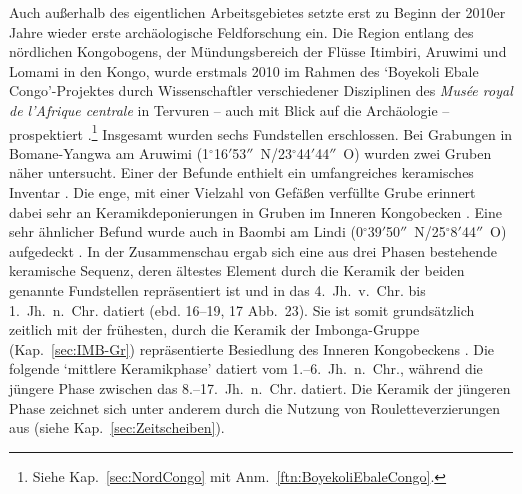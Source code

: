 Auch außerhalb des eigentlichen Arbeitsgebietes setzte erst zu Beginn der 2010er Jahre wieder erste archäologische Feldforschung ein. Die Region entlang des nördlichen Kongobogens, der Mündungsbereich der Flüsse Itimbiri, Aruwimi und Lomami in den Kongo, wurde erstmals 2010 im Rahmen des \enquote*{Boyekoli Ebale Congo}-Projektes durch Wissenschaftler verschiedener Disziplinen des \textit{Musée royal de l'Afrique centrale} in Tervuren -- auch mit Blick auf die Archäologie -- prospektiert \parencite{LivingstoneSmith.2011}.\footnote{Siehe Kap.~\ref{sec:NordCongo} mit Anm.~\ref{ftn:BoyekoliEbaleCongo}.} Insgesamt wurden sechs Fundstellen erschlossen. Bei Grabungen in Bomane-Yangwa am Aruwimi (1$^\circ$16$'$53$''$~N/23$^\circ$44$'$44$''$~O) wurden zwei Gruben näher untersucht. Einer der Befunde enthielt ein umfangreiches keramisches Inventar \parencite[ebd. 13 Abb. 2; ][5 Abb.~3]{LivingstoneSmith.2017}. Die enge, mit einer Vielzahl von Gefäßen verfüllte Grube erinnert dabei sehr an Keramikdeponierungen in Gruben im Inneren Kongobecken \parencite[siehe][256--264]{Wotzka.1993}. Eine sehr ähnlicher Befund wurde auch in Baombi am Lindi (0$^\circ$39$'$50$''$~N/25$^\circ$8$'$44$''$~O) aufgedeckt \parencites[78--79 Abb.~5--6]{Cornelissen.2013}[8 Abb.~10]{LivingstoneSmith.2017}. In der Zusammenschau ergab sich eine aus drei Phasen bestehende keramische Sequenz, deren ältestes Element durch die Keramik der beiden genannte Fundstellen repräsentiert ist und in das 4.~Jh.~v.~Chr. bis 1.~Jh.~n.~Chr. datiert (ebd. 16--19, 17 Abb.~23). Sie ist somit grundsätzlich zeitlich mit der frühesten, durch die Keramik der Imbonga-Gruppe (Kap.~\ref{sec:IMB-Gr}) repräsentierte Besiedlung des Inneren Kongobeckens \parencite[65]{Wotzka.1995}. Die folgende \enquote*{mittlere Keramikphase} datiert vom 1.--6.~Jh.~n.~Chr., während die jüngere Phase zwischen das 8.--17.~Jh.~n.~Chr. datiert. Die Keramik der jüngeren Phase zeichnet sich unter anderem durch die Nutzung von Rouletteverzierungen aus (siehe Kap.~\ref{sec:Zeitscheiben}).

